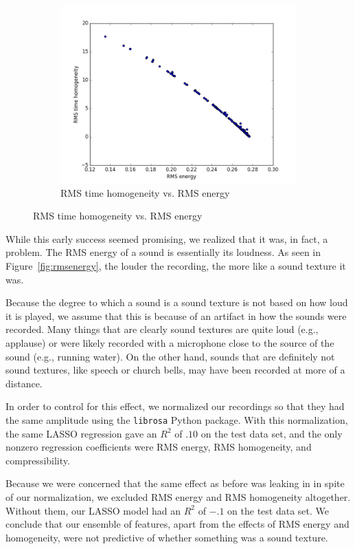 \documentclass{sig-alternate-05-2015}
\begin{document}
\begin{figure}[hbt]
        \begin{subfigure}[b]{0.45\textwidth}
      \centering
      \includegraphics[width=\textwidth]{figures/rms_homogeneity_vs_energy.png}
      \caption{RMS time homogeneity vs. RMS energy}
      \label{fig:homogvsenergy}
    \end{subfigure}
    \end{figure}

    While this early success seemed promising, we realized that it was, in fact, a problem. The RMS energy of a sound is essentially its loudness. As seen in Figure~\ref{fig:rmsenergy}, the louder the recording, the more like a sound texture it was.

    Because the degree to  which a sound is a sound texture is not based on how loud it is played, we assume that this is because of an artifact in how the sounds were recorded. Many things  that are clearly sound textures are quite loud (e.g.,  applause) or were likely recorded with a microphone close to the source of the sound (e.g., running water). On the other hand, sounds that are definitely not sound textures, like speech or church  bells, may have been recorded at more of a distance.

    In order to control for this effect, we normalized our recordings so that they had the same amplitude using the \texttt{librosa} Python package. With this normalization, the same LASSO regression gave an $R^2$ of $.10$ on the test data set, and the only nonzero regression coefficients were RMS energy, RMS homogeneity, and compressibility.

    Because we were concerned that the same effect as before was leaking in in spite of our normalization, we excluded RMS energy and RMS homogeneity altogether. Without them, our LASSO model had an $R^2$ of $-.1$ on the test data set. We conclude that our ensemble of features, apart from the effects of RMS energy and homogeneity, were not predictive of whether something  was a sound texture.
\end{document}
